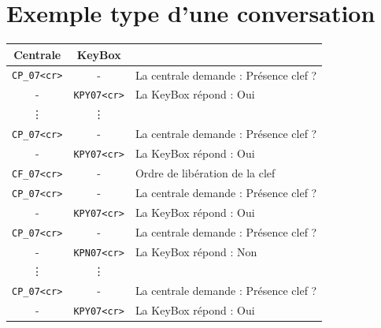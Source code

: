 \documentclass[a4paper, 10pt]{article} %
\newcommand{\rien}{-}
\begin{document}
\section{Exemple type d'une conversation}
\begin{center}
\begin{tabular}{|c|c|p{6cm}|}
\hline
Centrale&KeyBox&\\
\hline
\hline
\verb|CP_07<cr>|&\rien& La centrale demande : Présence clef ?\\
\rien&\verb|KPY07<cr>|& La KeyBox répond : Oui\\
\hline
\vdots&\vdots& 	\\
\hline
\verb|CP_07<cr>|&\rien& La centrale demande : Présence clef ?\\
\rien&\verb|KPY07<cr>|& La KeyBox répond : Oui\\
\hline
\verb|CF_07<cr>|&\rien& Ordre de libération de la clef\\
\hline
\verb|CP_07<cr>|&\rien& La centrale demande : Présence clef ?\\
\rien&\verb|KPY07<cr>|& La KeyBox répond : Oui\\
\hline
\verb|CP_07<cr>|&\rien& La centrale demande : Présence clef ?\\
\rien&\verb|KPN07<cr>|&La KeyBox répond : Non\\
\hline
\vdots&\vdots&\\
\hline
\verb|CP_07<cr>|&\rien& La centrale demande : Présence clef ?\\
\rien&\verb|KPY07<cr>|& La KeyBox répond : Oui\\
\hline
\end{tabular}
\end{center}
\end{document}
